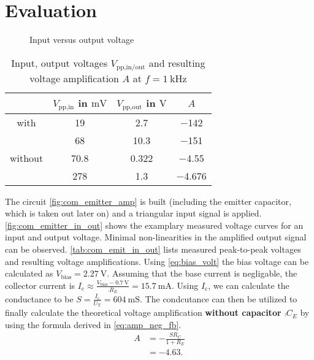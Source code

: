 \section{Evaluation}
\begin{figure}[tbp]
	\centering
	\caption{Input versus output voltage}
	\label{fig:com_emitter_in_out}
\end{figure}
\begin{table}[b!]
	\centering
	\caption{Input, output voltages $V_\text{pp,in/out}$ and resulting voltage amplification $A$ at $f=\SI{1}{\kilo\hertz}$}
	\label{tab:com_emit_in_out}
	\begin{tabular}{S|SSS}
		\toprule
		{}&	{$V_\text{pp,in}$ in $\si{\milli\volt}$}&	{$V_\text{pp,out}$ in $\si{\volt}$}&	{$A$}\\
		\midrule
		{with }	&	\num{19}	&	\num{2.7}	&	\num{-142}\\
		{}	&	\num{68}	&	\num{10.3}	&	\num{-151}\\
		\midrule
		{without }	&	\num{70.8}	&	\num{0.322}	&	\num{-4.55}\\
		{}	&	\num{278}	&	\num{1.3}	&	\num{-4.676}\\
		\bottomrule
	\end{tabular}
\end{table}
The circuit \autoref{fig:com_emitter_amp} is built (including the emitter capacitor, which is taken out later on) and a triangular input signal is applied.
\autoref{fig:com_emitter_in_out} shows the examplary measured voltage curves for an input and output voltage.
Minimal non-linearities in the amplified output signal can be observed.
\autoref{tab:com_emit_in_out} lists measured peak-to-peak voltages and resulting voltage amplifications.
Using \autoref{eq:bias_volt} the bias voltage can be calculated as $V_\text{bias}=\SI{2.27}{\volt}$.
Assuming that the base current is negligable, the collector current is $I_\text{c}\approx\frac{V_\text{bias}-\SI{0.7}{\volt}}{\comp{R_E}}=\SI{15.7}{\milli\ampere}$.
Using $I_\text{c}$, we can calculate the conductance to be $S=\frac{I_\text{c}}{U_\text{T}}=\SI{604}{\milli\siemens}$.
The condcutance can then be utilized to finally calculate the theoretical voltage amplification \textbf{without capacitor $\comp{C_E}$} by using the formula derived in \autoref{eq:amp_neg_fb}.
\begin{align*}
	A &= -\frac{SR_\text{C}}{1+R_E} \\
	&=\num{-4.63}.
\end{align*}
